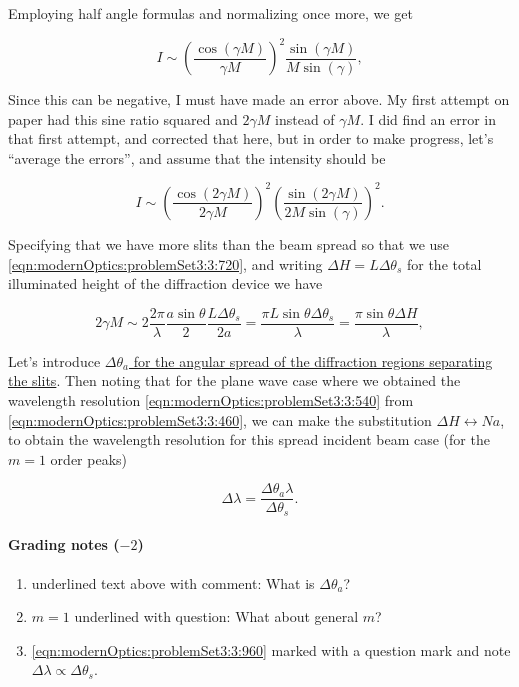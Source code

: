 {Employing half angle formulas and normalizing once more, we get

\begin{dmath}\label{eqn:modernOptics:problemSet3:3:900}
I \sim \left( \frac{\cos( \gamma M )}{\gamma M} \right)^2 \frac{\sin(\gamma M) }{ M \sin( \gamma)},
\end{dmath}

Since this can be negative, I must have made an error above.  My first attempt on paper had this sine ratio squared and $2 \gamma M$ instead of $\gamma M$.  I did find an error in that first attempt, and corrected that here, but in order to make progress, let's ``average the errors'', and assume that the intensity should be

\begin{dmath}\label{eqn:modernOptics:problemSet3:3:920}
I \sim \left( \frac{\cos( 2 \gamma M )}{2 \gamma M} \right)^2
\left( \frac{\sin(2 \gamma M) }{ 2 M \sin( \gamma)} \right)^2.
\end{dmath}

Specifying that we have more slits than the beam spread so that we use \ref{eqn:modernOptics:problemSet3:3:720}, and writing $\Delta H = L \Delta \theta_s$ for the total illuminated height of the diffraction device we have

\begin{dmath}\label{eqn:modernOptics:problemSet3:3:940}
2 \gamma M \sim
2 \frac{2 \pi}{\lambda} \frac{a \sin\theta}{2} \frac{L \Delta \theta_s}{2 a}
=
\frac{\pi L \sin\theta \Delta \theta_s}{\lambda}
=
\frac{\pi \sin\theta \Delta H}{\lambda},
\end{dmath}

Let's introduce \underline{$\Delta \theta_a$ for the angular spread of the diffraction regions separating the slits}.  Then noting that for the plane wave case where we obtained the wavelength resolution \ref{eqn:modernOptics:problemSet3:3:540} from \ref{eqn:modernOptics:problemSet3:3:460}, we can make the substitution $\Delta H \leftrightarrow N a$, to obtain the wavelength resolution for this spread incident beam case (for the \underline{$m = 1$} order peaks)

\begin{dmath}\label{eqn:modernOptics:problemSet3:3:960}
\boxed{
\Delta \lambda = \frac{\Delta \theta_a \lambda}{\Delta \theta_s}.
}
\end{dmath}

\paragraph{Grading notes ($-2$)}
\begin{enumerate}
\item underlined text above with comment: What is $\Delta \theta_a$?
\item $m = 1$ underlined with question: What about general $m$?
\item \ref{eqn:modernOptics:problemSet3:3:960} marked with a question mark and note $\Delta \lambda \propto \Delta \theta_s$.
\end{enumerate}

}
